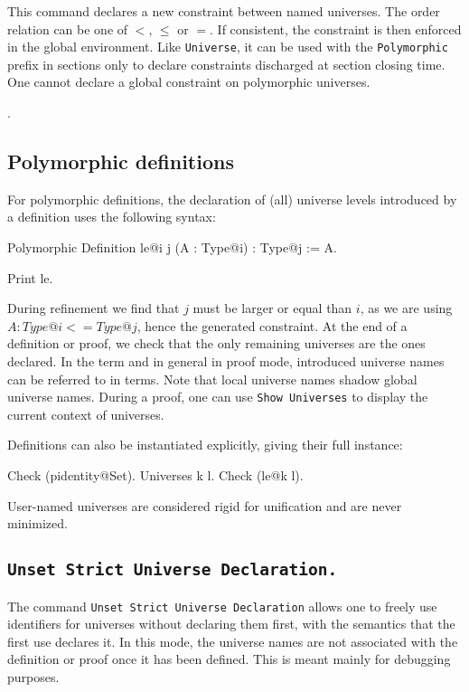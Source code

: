 This command declares a new constraint between named universes.
The order relation can be one of $<$, $\le$ or $=$. If consistent, 
the constraint is then enforced in the global environment. Like
\texttt{Universe}, it can be used with the \texttt{Polymorphic} prefix
in sections only to declare constraints discharged at section closing time.
One cannot declare a global constraint on polymorphic universes.

\begin{ErrMsgs}
\item {}.
\item {}
\end{ErrMsgs}

\subsection{Polymorphic definitions}
For polymorphic definitions, the declaration of (all) universe levels
introduced by a definition uses the following syntax:

\begin{coq_example*}
Polymorphic Definition le@{i j} (A : Type@{i}) : Type@{j} := A.
\end{coq_example*}
\begin{coq_example}
Print le.
\end{coq_example}

During refinement we find that $j$ must be larger or equal than $i$, as
we are using $A : Type@{i} <= Type@{j}$, hence the generated
constraint. At the end of a definition or proof, we check that the only
remaining universes are the ones declared. In the term and in general in
proof mode, introduced universe names can be referred to in
terms. Note that local universe names shadow global universe names.
During a proof, one can use \texttt{Show Universes} to display
the current context of universes.

Definitions can also be instantiated explicitly, giving their full instance:
\begin{coq_example}
Check (pidentity@{Set}).
Universes k l.
Check (le@{k l}).
\end{coq_example}

User-named universes are considered rigid for unification and are never
minimized.

\subsection{\tt Unset Strict Universe Declaration.
  \label{StrictUniverseDeclaration}}

The command \texttt{Unset Strict Universe Declaration} allows one to
freely use identifiers for universes without declaring them first, with
the semantics that the first use declares it. In this mode, the universe
names are not associated with the definition or proof once it has been
defined. This is meant mainly for debugging purposes.

